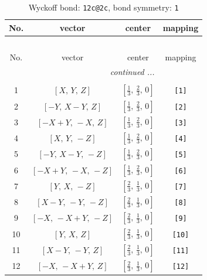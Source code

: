 \documentclass[fleqn,8pt]{jsarticle}
\begin{document}
\renewcommand{\arraystretch}{1.2}
\begin{longtable}{cccc}
\caption{Wyckoff bond: {\tt 12c@2c}, bond symmetry: {\tt 1}}
 \\
 \hline \hline
No. & vector & center & mapping \\ \hline \endfirsthead

\multicolumn{3}{l}{\tablename\ \thetable{}} \\
 \hline \hline
No. & vector & center & mapping \\ \hline \endhead

 \hline \hline
\multicolumn{3}{r}{\footnotesize\it continued ...} \\ \endfoot

 \hline \hline
\multicolumn{3}{r}{} \\ \endlastfoot

1 & $\left[ X,\, Y,\, Z \right]$ & $\left[ \frac{1}{3},\, \frac{2}{3},\, 0 \right]$ & {\tt [1]} \\ \hline
2 & $\left[ - Y,\, X - Y,\, Z \right]$ & $\left[ \frac{1}{3},\, \frac{2}{3},\, 0 \right]$ & {\tt [2]} \\ \hline
3 & $\left[ - X + Y,\, - X,\, Z \right]$ & $\left[ \frac{1}{3},\, \frac{2}{3},\, 0 \right]$ & {\tt [3]} \\ \hline
4 & $\left[ X,\, Y,\, - Z \right]$ & $\left[ \frac{1}{3},\, \frac{2}{3},\, 0 \right]$ & {\tt [4]} \\ \hline
5 & $\left[ - Y,\, X - Y,\, - Z \right]$ & $\left[ \frac{1}{3},\, \frac{2}{3},\, 0 \right]$ & {\tt [5]} \\ \hline
6 & $\left[ - X + Y,\, - X,\, - Z \right]$ & $\left[ \frac{1}{3},\, \frac{2}{3},\, 0 \right]$ & {\tt [6]} \\ \hline
7 & $\left[ Y,\, X,\, - Z \right]$ & $\left[ \frac{2}{3},\, \frac{1}{3},\, 0 \right]$ & {\tt [7]} \\ \hline
8 & $\left[ X - Y,\, - Y,\, - Z \right]$ & $\left[ \frac{2}{3},\, \frac{1}{3},\, 0 \right]$ & {\tt [8]} \\ \hline
9 & $\left[ - X,\, - X + Y,\, - Z \right]$ & $\left[ \frac{2}{3},\, \frac{1}{3},\, 0 \right]$ & {\tt [9]} \\ \hline
10 & $\left[ Y,\, X,\, Z \right]$ & $\left[ \frac{2}{3},\, \frac{1}{3},\, 0 \right]$ & {\tt [10]} \\ \hline
11 & $\left[ X - Y,\, - Y,\, Z \right]$ & $\left[ \frac{2}{3},\, \frac{1}{3},\, 0 \right]$ & {\tt [11]} \\ \hline
12 & $\left[ - X,\, - X + Y,\, Z \right]$ & $\left[ \frac{2}{3},\, \frac{1}{3},\, 0 \right]$ & {\tt [12]} \\
\end{longtable}
\end{document}
